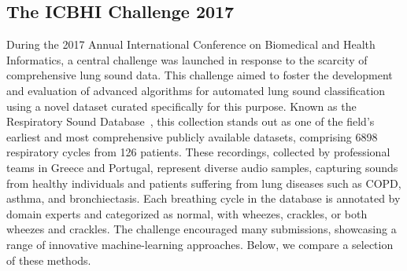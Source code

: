 \subsection{The ICBHI Challenge 2017}
During the 2017 Annual International Conference on Biomedical and Health Informatics, a central challenge was launched in response to the scarcity of comprehensive lung sound data. This challenge aimed to foster the development and evaluation of advanced algorithms for automated lung sound classification using a novel dataset curated specifically for this purpose. Known as the Respiratory Sound Database~\cite{rocha2018alpha}, this collection stands out as one of the field's earliest and most comprehensive publicly available datasets, comprising 6898 respiratory cycles from 126 patients. These recordings, collected by professional teams in Greece and Portugal, represent diverse audio samples, capturing sounds from healthy individuals and patients suffering from lung diseases such as COPD, asthma, and bronchiectasis. Each breathing cycle in the database is annotated by domain experts and categorized as normal, with wheezes, crackles, or both wheezes and crackles. The challenge encouraged many submissions, showcasing a range of innovative machine-learning approaches. Below, we compare a selection of these methods.

